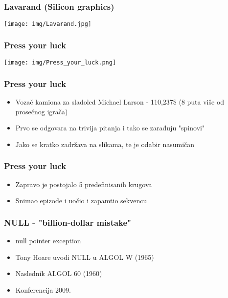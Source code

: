 \documentclass{beamer}
\begin{document}
\begin{frame}
    \frametitle{Lavarand (Silicon graphics)}
    \begin{center}
        \texttt{[image: img/Lavarand.jpg]}
    \end{center}
\end{frame}

\begin{frame}
    \frametitle{Press your luck}
    \begin{center}
        \texttt{[image: img/Press\_your\_luck.png]}
    \end{center}
\end{frame}

\begin{frame}
    \frametitle{Press your luck}
    \begin{itemize}
        \item Vozač kamiona za sladoled Michael Larson - 110,237\$ (8 puta više od prosečnog igrača) \newline
        \item Prvo se odgovara na trivija pitanja i tako se zarađuju "spinovi" \newline
        \item Jako se kratko zadržava na slikama, te je odabir nasumičan \newline
    \end{itemize}
\end{frame}

\begin{frame}
    \frametitle{Press your luck}
    \begin{itemize}
        \item Zapravo je postojalo 5 predefinisanih krugova \newline
        \item Snimao epizode i uočio i zapamtio sekvencu \newline
    \end{itemize}
\end{frame}

\begin{frame}
    \frametitle{NULL - "billion-dollar mistake"}
    \begin{itemize}
        \item null pointer exception \newline
        \item Tony Hoare uvodi NULL u ALGOL W (1965)\newline
        \item Naslednik ALGOL 60 (1960) \newline
        \item Konferencija 2009.
    \end{itemize}
\end{frame}
    
\end{document}
